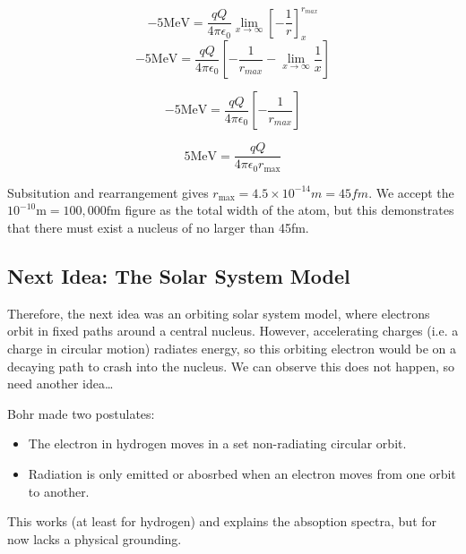 \[
    -5 \text{MeV} = \frac{qQ}{4 \pi \epsilon_0} \lim_{x \to \infty} \left[ - \frac{1}{r}\right]^{r_{max}}_x
\]
\[
    -5 \text{MeV} = \frac{qQ}{4 \pi \epsilon_0} \left[ -\frac{1}{r_{max}} - \lim_{x \to \infty} \frac{1}{x}\right]
\]

\[
    -5 \text{MeV} = \frac{qQ}{4 \pi \epsilon_0} \left[ -\frac{1}{r_{max}}\right]
\]

\[
    5 \text{MeV} = \frac{qQ}{4 \pi \epsilon_0 r_{\text{max}}}
\]

Subsitution and rearrangement gives $r_{\text{max}} = 4.5 \times 10^{-14}m = 45fm$.
We accept the $10^{-10}\text{m} = 100,000 \text{fm}$ figure as the total width of the atom, but this demonstrates that there must exist a nucleus of no larger than 45fm.

\subsection*{Next Idea: The Solar System Model}
Therefore, the next idea was an orbiting solar system model, where electrons orbit in fixed paths around a central nucleus. However, accelerating charges (i.e. a charge in circular motion) radiates energy, so this orbiting electron would be on a decaying path to crash into the nucleus. We can observe this does not happen, so need another idea\dots

Bohr made two postulates:
\begin{itemize}
    \item The electron in hydrogen moves in a set non-radiating circular orbit.
    \item Radiation is only emitted or abosrbed when an electron moves from one orbit to another.
\end{itemize}

This works (at least for hydrogen) and explains the absoption spectra, but for now lacks a physical grounding.